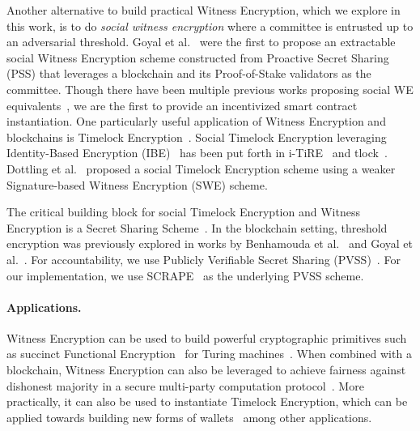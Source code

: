 Another alternative to build practical Witness Encryption, which we explore in this work, is to do \emph{social witness encryption} where a committee is entrusted up to an adversarial threshold.
Goyal et al.~\cite{eweb} were the first to propose an extractable social Witness Encryption scheme constructed from Proactive Secret Sharing (PSS) that leverages a blockchain and its Proof-of-Stake validators as the committee.
Though there have been multiple previous works proposing social WE equivalents~\cite{mcfly, campanelli,eweb}, we are the first to provide an incentivized smart contract instantiation.
One particularly useful application of Witness Encryption and blockchains is Timelock Encryption~\cite{timelock_puzzles,timelock_from_crc,timed_release_cryptography}.
Social Timelock Encryption leveraging Identity-Based Encryption (IBE)~\cite{ibe} has been put forth in i-TiRE~\cite{i-TiRE} and tlock~\cite{tlock}.
Dottling et al.~\cite{mcfly} proposed a social Timelock Encryption scheme using a weaker Signature-based Witness Encryption (SWE) scheme.

The critical building block for social Timelock Encryption and Witness Encryption is a Secret Sharing Scheme~\cite{shamir_ss}. In the blockchain setting, threshold encryption was previously explored in works by Benhamouda et al.~\cite{benhamouda_ecpss} and Goyal et al.~\cite{eweb}.
For accountability, we use Publicly Verifiable Secret Sharing (PVSS)~\cite{first_pvss_chor,pvss_stadler}.
For our implementation, we use SCRAPE~\cite{pvss_scrape} as the underlying PVSS scheme.

\paragraph{Applications.}
Witness Encryption can be used to build powerful cryptographic primitives such as succinct Functional Encryption~\cite{functional_encryption,fe_survey_review} for Turing machines~\cite{turing_machine_fe}.
When combined with a blockchain, Witness Encryption can also be leveraged to achieve fairness against dishonest majority in a secure multi-party computation protocol~\cite{we_mpc_fairness}.
More practically, it can also be used to instantiate Timelock Encryption, which can be applied towards building new forms of wallets~\cite{horus} among other applications.